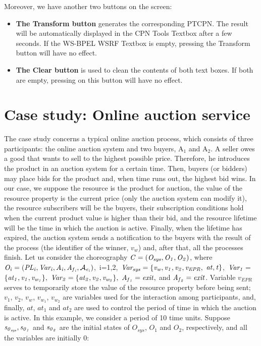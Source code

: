 Moreover, we have another two buttons on the screen:

\begin{itemize}
\item{\textbf{The Transform button}
generates the corresponding PTCPN. The result will be automatically displayed in the CPN Tools Textbox after a few seconds. If the WS-BPEL WSRF Textbox is empty, pressing the Transform button will have no effect.}

\item{\textbf{The Clear button}
is used to clean the contents of both text boxes. If both are empty, pressing on this button will have no effect.}
\end{itemize}

\section*{Case study: Online auction service}\label{cs}

The case study concerns a typical online auction process, which consists of three participants:
the online auction system and two buyers, A$_1$ and A$_2$. A seller owes a good that wants to sell to the highest possible price. Therefore, he introduces the product
in an auction system for a certain time. Then, buyers (or bidders) may place bids for the product and, when time runs out, the highest bid wins. In our case, we suppose the resource is the product for auction, the value of the resource property is the current price (only the auction system can modify it), the resource subscribers will be the buyers, their subscription conditions hold when the current product value is higher than their bid, and the resource lifetime will be the time in which the auction is active. Finally, when the lifetime has expired, the auction system sends a notification to the buyers with the result of the process (the identifier of the winner, $v_w$) and, after that, all the processes finish. Let us consider the choreography ${\it C=(O_{sys},O_1,O_2)}$, where 
${\it O_i=(PL_i,Var_i,A_i,A_{f{_i}},\mathcal{A}_{e{_i}})}$,~i=1,2,~${\it Var_{sys}=\{v_w,v_1,v_2,v_{EPR},}$
${\it at,t\}}$,~${\it Var_1= }$ \\ ${\it \{at_1,v_1,v_{w{_1}}\},\ Var_2=\{at_2,v_2,v_{w_{2}}\},\ A_{f{_1}}=exit,}$ and
${\it A_{f{_2}}=exit}$. Variable $v_{EPR}$ serves to temporarily store the value of the resource property before being sent; $v_1$, $v_2$, $v_{w_{}}$, $v_{w_{1}}$, $v_{w_{2}}$ are variables used for the interaction among participants, and, finally, $at$, $at_1$ and $at_2$ are used to control the period of time in which the auction is active. In this example, we consider a period of 10 time units. Suppose ${\it s_{0{_{sys}}}, s_{0{_1}}}$ and ${\it s_{0{_2}}}$ are the initial states of $O_{sys}$, $O_1$ and $O_2$, respectively, and all the variables are initially $0$: \\[-0.2cm]


